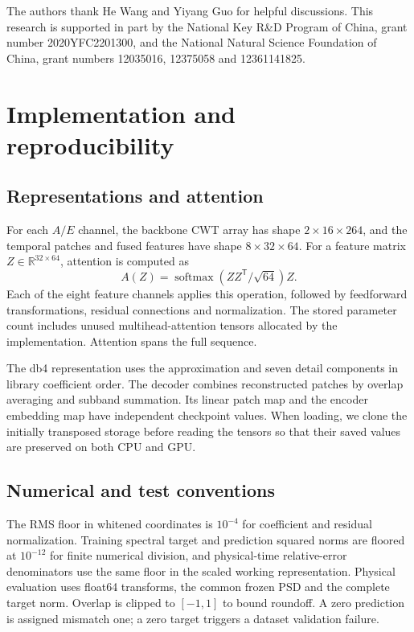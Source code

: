 \documentclass[10pt,prd,aps,a4paper,twocolumn,superscriptaddress,nofootinbib,floatfix]{revtex4-2}
\begin{document}
\begin{acknowledgments}
The authors thank He Wang and Yiyang Guo for helpful discussions. This research is supported in part by the National Key R\&D Program of China, grant number 2020YFC2201300, and the National Natural Science Foundation of China, grant numbers 12035016, 12375058 and 12361141825.

\end{acknowledgments}
\clearpage
\appendix
\section{Implementation and reproducibility}\label{app:model_analysis}
\subsection{Representations and attention}
For each $A/E$ channel, the backbone CWT array has shape $2\times16\times264$, and the temporal patches and fused features have shape $8\times32\times64$. For a feature matrix $Z\in\mathbb R^{32\times64}$, attention is computed as
\begin{equation}
A(Z)=\operatorname{softmax}(ZZ^{\mathsf T}/\sqrt{64})Z.
\end{equation}
Each of the eight feature channels applies this operation, followed by feedforward transformations, residual connections and normalization. The stored parameter count includes unused multihead-attention tensors allocated by the implementation. Attention spans the full sequence.

The db4 representation uses the approximation and seven detail components in library coefficient order. The decoder combines reconstructed patches by overlap averaging and subband summation. Its linear patch map and the encoder embedding map have independent checkpoint values. When loading, we clone the initially transposed storage before reading the tensors so that their saved values are preserved on both CPU and GPU.

\subsection{Numerical and test conventions}
The RMS floor in whitened coordinates is $10^{-4}$ for coefficient and residual normalization. Training spectral target and prediction squared norms are floored at $10^{-12}$ for finite numerical division, and physical-time relative-error denominators use the same floor in the scaled working representation. Physical evaluation uses float64 transforms, the common frozen PSD and the complete target norm. Overlap is clipped to $[-1,1]$ to bound roundoff. A zero prediction is assigned mismatch one; a zero target triggers a dataset validation failure.
\end{document}
